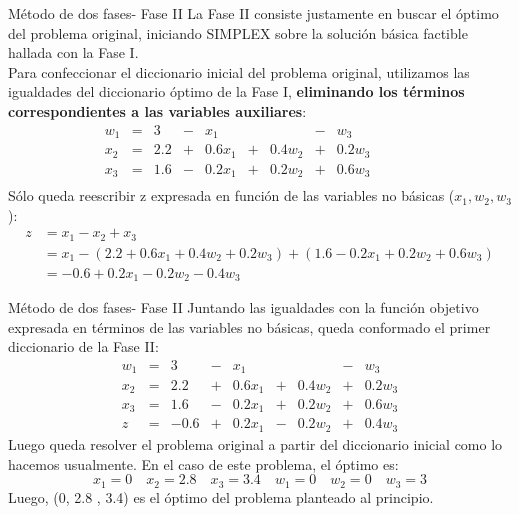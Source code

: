 \documentclass[10pt, aspectratio=169]{beamer}
\begin{document}
    \begin{frame}{Método de dos fases- Fase II}
        \small
        La Fase II consiste justamente en buscar el óptimo del problema original, iniciando SIMPLEX sobre la solución
        básica factible hallada con la Fase I. \\
        Para confeccionar el diccionario inicial del problema original, utilizamos las igualdades del diccionario óptimo
        de la Fase I, \textbf{eliminando los términos correspondientes a las variables auxiliares}:
        \[\begin{array}{rrrrrrrrrrrrr}
              w_1 & = & 3   & - & x_1    &   &        & - & w_3    & & & & \\
              x_2 & = & 2.2 & + & 0.6x_1 & + & 0.4w_2 & + & 0.2w_3 & & & & \\
              x_3 & = & 1.6 & - & 0.2x_1 & + & 0.2w_2 & + & 0.6w_3 & & & & \\
        \end{array}
        \]
        Sólo queda reescribir z expresada en función de las variables no básicas ($x_1, w_2,w_3$):
        \[
            \begin{split}
                z & = x_1- x_2 +x_3 \\
                & =  x_1-(2.2 + 0.6x_1 + 0.4w_2 + 0.2w_3) + (1.6 - 0.2x_1 + 0.2w_2 + 0.6w_3) \\
                & = -0.6 + 0.2x_1 - 0.2w_2 -0.4w_3
            \end{split}
        \]
    \end{frame}

    \begin{frame}{Método de dos fases- Fase II}
        Juntando las igualdades con la función objetivo expresada en términos de las variables no básicas, queda
        conformado el primer diccionario de la Fase II:
        \[\begin{array}{rrrrrrrrr}
              w_1 & = & 3    & - & x_1    &   &        & - & w_3    \\
              x_2 & = & 2.2  & + & 0.6x_1 & + & 0.4w_2 & + & 0.2w_3 \\
              x_3 & = & 1.6  & - & 0.2x_1 & + & 0.2w_2 & + & 0.6w_3 \\ \hline
              z   & = & -0.6 & + & 0.2x_1 & - & 0.2w_2 & + & 0.4w_3
        \end{array}
        \]
        Luego queda resolver el problema original a partir del diccionario inicial como lo hacemos usualmente. En el
        caso de este problema, el óptimo es:
        \[ x_1=0 \quad x_2 = 2.8\quad x_3=3.4 \quad w_1=0 \quad w_2=0 \quad w_3=3  \]
        Luego, (0, 2.8 , 3.4) es el óptimo del problema planteado al principio.
    \end{frame}
\end{document}
